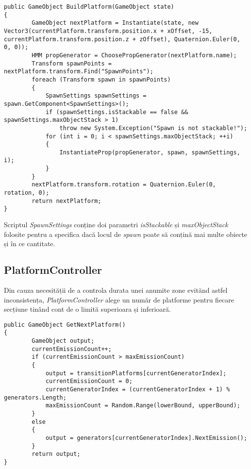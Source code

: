 \begin{lstlisting}[caption=Funcțiile din PlatformBuilder,
  label=a_label]
public GameObject BuildPlatform(GameObject state)
{
        GameObject nextPlatform = Instantiate(state, new Vector3(currentPlatform.transform.position.x + xOffset, -15, currentPlatform.transform.position.z + zOffset), Quaternion.Euler(0, 0, 0));
        HMM propGenerator = ChoosePropGenerator(nextPlatform.name);
        Transform spawnPoints = nextPlatform.transform.Find("SpawnPoints");
        foreach (Transform spawn in spawnPoints)
        {
            SpawnSettings spawnSettings = spawn.GetComponent<SpawnSettings>();
            if (spawnSettings.isStackable == false && spawnSettings.maxObjectStack > 1)
                throw new System.Exception("Spawn is not stackable!");
            for (int i = 0; i < spawnSettings.maxObjectStack; ++i)
            {
                InstantiateProp(propGenerator, spawn, spawnSettings, i);
            }
        }
        nextPlatform.transform.rotation = Quaternion.Euler(0, rotation, 0);
        return nextPlatform;
}
\end{lstlisting}

Scriptul \textit{SpawnSettings} conține doi parametri \textit{isStackable} și \textit{maxObjectStack} folosite pentru a specifica dacă locul de \textit{spawn} poate să conțină mai multe obiecte și în ce cantitate.\par

\subsection{PlatformController}

Din cauza necesității de a controla durata unei anumite zone evitănd astfel inconsistența, \textit{PlatformController} alege un număr de platforme pentru fiecare secțiune tinând cont de o limită superioara și inferioară.\par

\begin{lstlisting}[caption=Funcțiile din PlatformController,
  label=a_label,
  mathescape=false]
public GameObject GetNextPlatform()
{
        GameObject output;
        currentEmissionCount++;
        if (currentEmissionCount > maxEmissionCount)
        {
            output = transitionPlatforms[currentGeneratorIndex];
            currentEmissionCount = 0;
            currentGeneratorIndex = (currentGeneratorIndex + 1) % generators.Length;
            maxEmissionCount = Random.Range(lowerBound, upperBound);
        }
        else
        {
            output = generators[currentGeneratorIndex].NextEmission();
        }
        return output;
}
\end{lstlisting}
